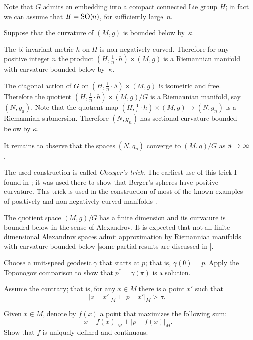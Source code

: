 \medskip

Note that $G$ admits an embedding into a compact connected Lie group $H$;
in fact we can assume that $H=\mathrm{SO}(n)$, for sufficiently large~$n$.

Suppose that the curvature of $(M,g)$ is bounded below by~$\kappa$.

The bi-invariant metric $h$ on $H$ is non-negatively curved.
Therefore for any positive integer $n$ the product $(H,\tfrac1n\cdot h)\times (M,g)$ is a Riemannian manifold with  curvature bounded below by~$\kappa$.

The diagonal action of $G$ on $(H,\tfrac1n\cdot h)\times (M,g)$ is isometric and free. 
Therefore 
the quotient $(H,\tfrac1n\cdot h)\times (M,g)/G$
is a Riemannian manifold, say $(N,g_n)$.
Note that the quotient map $(H,\tfrac1n\cdot h)\times (M,g)\to (N,g_n)$ is a Riemannian submersion.
Therefore $(N,g_n)$ has sectional curvature bounded below by $\kappa$.

It remains to observe that the spaces $(N,g_n)$ converge to $(M,g)/G$ as $n\z\to \infty$.\qeds

The used construction is called \emph{Cheeger's trick}.
The earliest use of this trick I found in \cite{GKM}; 
it was used there to show that Berger's spheres have positive curvature.
This trick is used in the construction of most of the known examples of positively and non-negatively curved manifolds
 \cite{cheeger,aloff-wallach,gromoll-meyer,eschenburg-spaces,bazajkin}.
 
The quotient space $(M,g)/G$ has a finite dimension and its curvature is bounded below in the sense of Alexandrov. 
It is expected that not all finite dimensional Alexandrov spaces admit approximation by Riemannian manifolds with curvature bounded below
[some partial results are discussed in ].








Choose a unit-speed geodesic $\gamma$ that starts at $p$;
that is, $\gamma(0)=p$.
Apply the Toponogov comparison to show that $p^*=\gamma(\pi)$ is a solution. 
\qeds

Assume the contrary;
that is, for any $x\in M$ there is a point $x'$ such that 
\[|x-x'|_M+|p-x'|_M>\pi.\]

Given $x\in M$, denote by $f(x)$ a point that maximizes the following sum:
\[|x-f(x)|_M+|p-f(x)|_M.\]
Show that $f$ is uniquely defined and continuous.

